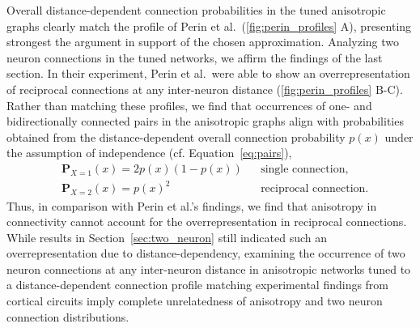 Overall distance-dependent connection probabilities in the tuned
an\-iso\-tro\-pic graphs clearly match the profile of Perin et
al.~(\autoref{fig:perin_profiles} A), presenting strongest the
argument in support of the chosen approximation. Analyzing two neuron
connections  in the tuned
networks, we affirm the findings of the last section. In their
experiment, Perin et al.~were able to show an overrepresentation of
reciprocal connections at any inter-neuron distance
(\autoref{fig:perin_profiles} B-C). Rather than matching these
profiles, we find that occurrences of one- and bidirectionally
connected pairs in the anisotropic graphs align with probabilities
obtained from the distance-dependent overall connection probability
$p(x)$ under the assumption of independence (cf. Equation~\ref{eq:pairs}),
\begin{equation*}
  \label{eq:pairs}
  \begin{aligned}%
    & \mathbf{P}_{X=1}(x) = 2p(x) \left(1-p(x) \right)    
      && \text{single connection,}\\
    & \mathbf{P}_{X=2}(x) = p(x)^2        
      &&\text{reciprocal connection.}
  \end{aligned}%
\end{equation*}%
\vspace{0.1cm}%
Thus, in comparison with Perin et al.'s findings, we find that
anisotropy in connectivity cannot account for the overrepresentation
in reciprocal connections. While results in
Section~\ref{sec:two_neuron} still indicated such an
overrepresentation due to distance-dependency, examining the
occurrence of two neuron connections at any inter-neuron distance in
anisotropic networks tuned to a distance-dependent connection profile
matching experimental findings from cortical circuits imply complete
unrelatedness of anisotropy and two neuron connection distributions.

